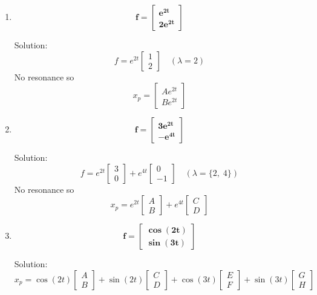 \documentclass[12pt]{article}
\begin{document}
\begin{enumerate}
    \item \[\mathbf{f = \begin{bmatrix}
        e^{2t}\\
        2e^{2t}
    \end{bmatrix}}\]

    Solution:
    \[f = e^{2t} \begin{bmatrix}
        1\\2
    \end{bmatrix} \quad (\lambda = 2)\]
    No resonance so 
    \[\boxed{x_p = \begin{bmatrix}
        Ae^{2t}\\
        Be^{2t}
    \end{bmatrix}}\]

    \item \[\mathbf{f = \begin{bmatrix}
        3e^{2t}\\
        -e^{4t}
    \end{bmatrix}}\]

    Solution:
    \[f = e^{2t} \begin{bmatrix}
        3\\0
    \end{bmatrix} + e^{4t} \begin{bmatrix}
        0\\-1
    \end{bmatrix} \quad (\lambda = \{2, \; 4\})\]
    No resonance so 
    \[\boxed{x_p = e^{2t} \begin{bmatrix}
        A\\B
    \end{bmatrix} + e^{4t} \begin{bmatrix}
        C\\D
    \end{bmatrix}}\]

    \item \[\mathbf{f = \begin{bmatrix}
        \cos (2t)\\
        \sin (3t)
    \end{bmatrix}}\]

    Solution: 
    \[\boxed{x_p = \cos(2t) \begin{bmatrix}
        A\\B
    \end{bmatrix} + \sin(2t) \begin{bmatrix}
        C\\D
    \end{bmatrix} + \cos(3t) \begin{bmatrix}
        E\\F
    \end{bmatrix} + \sin(3t) \begin{bmatrix}
        G\\H
    \end{bmatrix}}\]
   

\end{enumerate}
\end{document}

